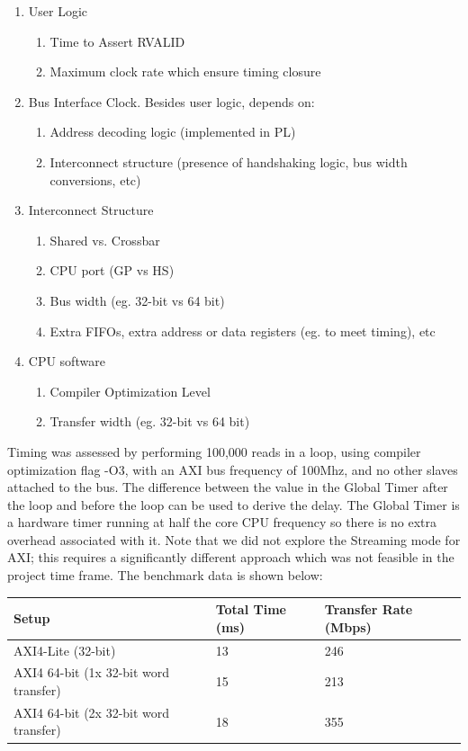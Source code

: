 \documentclass[journal]{IEEEtran}
\begin{document}
\begin{enumerate}
  \item User Logic
  \begin{enumerate}
    \item Time to Assert RVALID
    \item Maximum clock rate which ensure timing closure
  \end{enumerate}
  \item Bus Interface Clock. Besides user logic, depends on: 
  \begin{enumerate}
    \item Address decoding logic (implemented in PL) 
   \item  Interconnect structure (presence of handshaking logic, bus width conversions, etc)
  \end{enumerate}
  \item Interconnect Structure 
 \begin{enumerate}
    \item Shared vs. Crossbar
    \item CPU port (GP vs HS)
    \item Bus width (eg. 32-bit vs 64 bit)
    \item Extra FIFOs, extra address or data registers (eg. to meet timing), etc
  \end{enumerate}
  \item CPU software
 \begin{enumerate}
    \item Compiler Optimization Level
    \item Transfer width (eg. 32-bit vs 64 bit) 
  \end{enumerate}
\end{enumerate}

Timing was assessed by performing 100,000 reads in a loop, using compiler optimization flag -O3, with an AXI bus frequency of 100Mhz, and no other slaves attached to the bus. The difference  between the value in the Global Timer after the loop and before the loop can be used to derive the delay. The Global Timer is a hardware timer running at half the core CPU frequency so there is no extra overhead associated with it. Note that we did not explore the Streaming mode for AXI; this requires a significantly different approach which was not feasible in the project time frame. The benchmark data is shown below:

\begin{table}[h]
\begin{tabular}{@{}lll@{}}
\toprule
Setup                                 & Total Time (ms) & Transfer Rate (Mbps) \\ \midrule
AXI4-Lite (32-bit)                    & 13              & 246                             \\
AXI4 64-bit (1x 32-bit word transfer) & 15              & 213                             \\
AXI4 64-bit (2x 32-bit word transfer) & 18              & 355                             \\ \bottomrule
\end{tabular}
\end{table}
\end{document}
